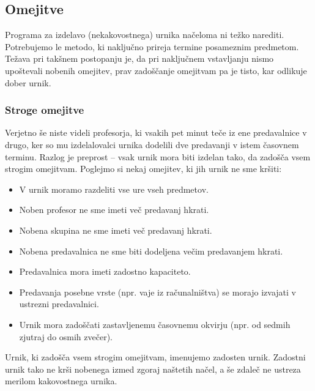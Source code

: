 \documentclass[a4paper,10pt]{article}
\begin{document}
\subsection{Omejitve} %

Programa za izdelavo (nekakovostnega) urnika načeloma ni težko narediti. Potrebujemo
le metodo, ki naključno prireja termine posameznim predmetom. Težava pri takšnem postopanju
je, da pri naključnem vstavljanju nismo upoštevali nobenih omejitev, prav zadoščanje omejitvam
pa je tisto, kar odlikuje dober urnik.

\subsubsection{Stroge omejitve} %

Verjetno še niste videli profesorja, ki vsakih pet minut teče iz ene predavalnice v drugo,
ker so mu izdelalovalci urnika dodelili dve predavanji v istem časovnem terminu. Razlog
je preprost -- vsak urnik mora biti izdelan tako, da zadošča vsem strogim omejitvam.
Poglejmo si nekaj omejitev, ki jih urnik ne sme kršiti:

   
   \begin{itemize}
      \item V urnik moramo razdeliti vse ure vseh predmetov.
      \item Noben profesor ne sme imeti več predavanj hkrati.
      \item Nobena skupina ne sme imeti več predavanj hkrati.
      \item Nobena predavalnica ne sme biti dodeljena večim predavanjem hkrati.
      \item Predavalnica mora imeti zadostno kapaciteto.
      \item Predavanja posebne vrste (npr. vaje iz računalništva) se morajo izvajati v ustrezni predavalnici.
      \item Urnik mora zadoščati zastavljenemu časovnemu okvirju (npr. od sedmih zjutraj do osmih zvečer).
   \end{itemize}

\noindent
Urnik, ki zadošča vsem strogim omejitvam, imenujemo zadosten urnik. Zadostni urnik tako ne
krši nobenega izmed zgoraj naštetih načel, a še zdaleč ne ustreza merilom kakovostnega urnika.
\end{document}
